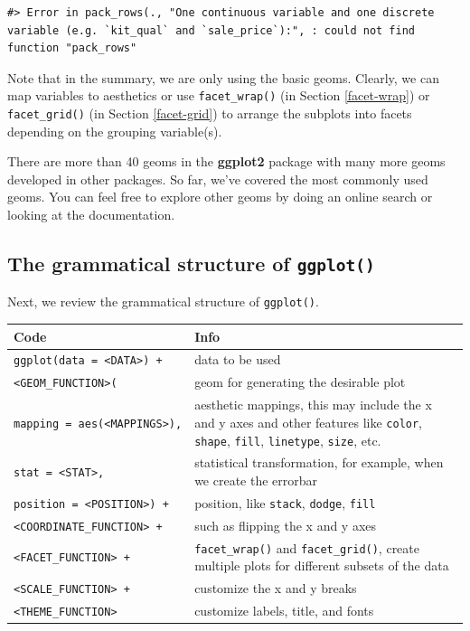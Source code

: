 \documentclass[
]{book}
\begin{document}
\begin{verbatim}
#> Error in pack_rows(., "One continuous variable and one discrete variable (e.g. `kit_qual` and `sale_price`):", : could not find function "pack_rows"
\end{verbatim}

Note that in the summary, we are only using the basic geoms. Clearly, we can map variables to aesthetics or use \texttt{facet\_wrap()} (in Section \ref{facet-wrap}) or \texttt{facet\_grid()} (in Section \ref{facet-grid}) to arrange the subplots into facets depending on the grouping variable(s).

There are more than 40 geoms in the \textbf{ggplot2} package with many more geoms developed in other packages. So far, we've covered the most commonly used geoms. You can feel free to explore other geoms by doing an online search or looking at the documentation.

\hypertarget{the-grammatical-structure-of-ggplot}{%
\subsection{\texorpdfstring{The grammatical structure of \texttt{ggplot()}}{The grammatical structure of ggplot()}}\label{the-grammatical-structure-of-ggplot}}

Next, we review the grammatical structure of \texttt{ggplot()}.

\begin{longtable}[]{@{}
  >{\raggedright\arraybackslash}p{}
  >{\raggedright\arraybackslash}p{}@{}}
\toprule
Code & Info \\
\midrule
\endhead
\texttt{ggplot(data\ =\ \textless{}DATA\textgreater{})\ +} & data to be used \\
\texttt{\textless{}GEOM\_FUNCTION\textgreater{}(} & geom for generating the desirable plot \\
\texttt{mapping\ =\ aes(\textless{}MAPPINGS\textgreater{}),} & aesthetic mappings, this may include the x and y axes and other features like \texttt{color}, \texttt{shape}, \texttt{fill}, \texttt{linetype}, \texttt{size}, etc. \\
\texttt{stat\ =\ \textless{}STAT\textgreater{},} & statistical transformation, for example, when we create the errorbar \\
\texttt{position\ =\ \textless{}POSITION\textgreater{})\ +} & position, like \texttt{stack}, \texttt{dodge}, \texttt{fill} \\
\texttt{\textless{}COORDINATE\_FUNCTION\textgreater{}\ +} & such as flipping the x and y axes \\
\texttt{\textless{}FACET\_FUNCTION\textgreater{}\ +} & \texttt{facet\_wrap()} and \texttt{facet\_grid()}, create multiple plots for different subsets of the data \\
\texttt{\textless{}SCALE\_FUNCTION\textgreater{}\ +} & customize the x and y breaks \\
\texttt{\textless{}THEME\_FUNCTION\textgreater{}} & customize labels, title, and fonts \\
\bottomrule
\end{longtable}
\end{document}
